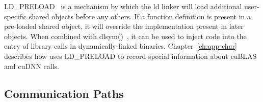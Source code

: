 LD\_PRELOAD~\cite{kerrisk2017ld} is a mechanism by which the ld linker will load additional user-specific shared objects before any others.
If a function definition is present in a pre-loaded shared object, it will override the implementation present in later objects.
When combined with dlsym()~\cite{kerrisk2017dlysm}, it can be used to inject code into the entry of library calls in dynamically-linked binaries.
Chapter~\ref{ch:app-char} describes how  uses LD\_PRELOAD to record special information about cuBLAS and cuDNN calls.

\cite{kerrisk2017ld}

\subsection{ Communication Paths}

